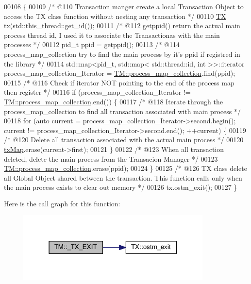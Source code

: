 \begin{DoxyCode}
00108                  \{
00109     \textcolor{comment}{/*  @110 Transaction manger create a local Transaction Object to access the TX class function without
       nesting any transaction */}
00110     \hyperlink{class_t_x}{TX} tx(std::this\_thread::get\_id());
00111     \textcolor{comment}{/* @112 getppid() return the actual main process thread id, I used it to associate the Transactionas
       with the main processes */}
00112     pid\_t ppid = getppid();
00113     \textcolor{comment}{/* @114 process\_map\_collection try to find the main process by it's ppid if registred in the library */}
00114     std::map<pid\_t, std::map< std::thread::id, int >>::iterator process\_map\_collection\_Iterator = 
      \hyperlink{class_t_m_a6d417b18213968da2a70a914e80d639b_a6d417b18213968da2a70a914e80d639b}{TM::process\_map\_collection}.find(ppid);
00115     \textcolor{comment}{/* @116 Check if iterator NOT pointing to the end of the process map then register */}
00116     \textcolor{keywordflow}{if} (process\_map\_collection\_Iterator != \hyperlink{class_t_m_a6d417b18213968da2a70a914e80d639b_a6d417b18213968da2a70a914e80d639b}{TM::process\_map\_collection}.end()) \{
00117         \textcolor{comment}{/* @118 Iterate through the process\_map\_collection to find all transaction associated with main
       process */}
00118         \textcolor{keywordflow}{for} (\textcolor{keyword}{auto} current = process\_map\_collection\_Iterator->second.begin(); current != 
      process\_map\_collection\_Iterator->second.end(); ++current) \{
00119             \textcolor{comment}{/* @120 Delete all transaction associated with the actual main process */}
00120             \hyperlink{class_t_m_a0333dfa193ea99d7626de74a2b932e9b_a0333dfa193ea99d7626de74a2b932e9b}{txMap}.erase(current->first);
00121         \}
00122         \textcolor{comment}{/* @123 When all transaction deleted, delete the main process from the Transacion Manager */}
00123         \hyperlink{class_t_m_a6d417b18213968da2a70a914e80d639b_a6d417b18213968da2a70a914e80d639b}{TM::process\_map\_collection}.erase(ppid);
00124     \}
00125     \textcolor{comment}{/* @126 TX class delete all Global Object shared between the transaction. This function calls only when
       the main process exists to clear out memory */}
00126     tx.ostm\_exit();
00127 \}
\end{DoxyCode}


Here is the call graph for this function\+:\nopagebreak
\begin{figure}[H]
\begin{center}
\leavevmode
\includegraphics[width=277pt]{class_t_m_a5e2d1127f2429f2f524d25f430eade06_a5e2d1127f2429f2f524d25f430eade06_cgraph}
\end{center}
\end{figure}


